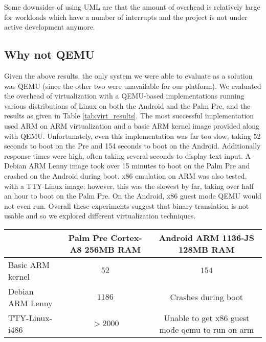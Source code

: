 Some downsides of using UML are that the amount of overhead is relatively large for workloads which have a number of interrupts and the project is not under active development anymore.

\subsection{Why not QEMU}
\label{sec:ynotqemu}
Given the above results, the only system we were able to evaluate as a solution was QEMU (since the other two were unavailable for our platform).  We evaluated the overhead of virtualization with a QEMU-based implementations running various distributions of Linux on both the Android and the Palm Pre, and the results as given in Table \ref{tab:virt_results}. The most successful implementation used ARM on ARM virtualization and a basic ARM kernel image provided along with QEMU. Unfortunately, even this implementation was far too slow, taking 52 seconds to boot on the Pre and 154 seconds to boot on the Android. Additionally response times were high, often taking several seconds to display text input. A Debian ARM Lenny image took over 15 minutes to boot on the Palm Pre and crashed on the Android during boot. x86 emulation on ARM was also tested, with a TTY-Linux image; however, this was the slowest by far, taking over half an hour to boot on the Palm Pre. On the Android, x86 guest mode QEMU would not even run. Overall these experiments suggest that binary translation is not usable and so we explored different virtualization techniques.

\begin{table*}[bth]
\begin{tabular}{|l|c|c|}
\hline & Palm Pre Cortex-A8 256MB RAM & Android ARM 1136-JS 128MB RAM \\ 
\hline Basic ARM kernel & $52$ & $154$ \\ [2pt]
 Debian ARM Lenny & $1186$ & Crashes during boot \\ [2pt]
 TTY-Linux-i486 & $>2000$ & Unable to get x86 guest mode qemu to run on arm \\[2pt]
\hline 
\end{tabular}
\caption{
Virtualization Results: Kernel Boot time in seconds in QEMU
}
\label{tab:virt_results}
\end{table*}


